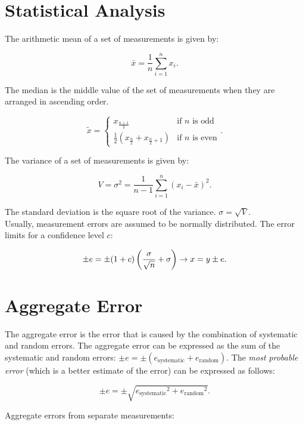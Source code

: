 \documentclass{report}
\begin{document}
\section{Statistical Analysis}

The arithmetic mean of a set of measurements is given by:

\[
	\bar{x} = \frac{1}{n} \sum_{i=1}^{n} x_i
	.\]

The median is the middle value of the set of measurements when they are arranged in ascending order.

\[
	\tilde{x} = \begin{cases}
		x_{\frac{n+1}{2}}                                 & \text{if $n$ is odd}  \\
		\frac{1}{2} (x_{\frac{n}{2}} + x_{\frac{n}{2}+1}) & \text{if $n$ is even}
	\end{cases}
	.\]

The variance of a set of measurements is given by:

\[
	V = \sigma^2 = \frac{1}{n-1} \sum_{i=1}^{n} (x_i - \bar{x})^2
	.\]

The standard deviation is the square root of the variance. $\sigma = \sqrt{V}$.\\

Usually, measurement errors are assumed to be normally distributed. The error limits for a confidence level $c$:

\[
	\pm e = \pm (1+c) \left( \frac{\sigma }{\sqrt{n}} + \sigma \right) \rightarrow x = y \pm e
	.\]

\section{Aggregate Error}

The aggregate error is the error that is caused by the combination of systematic and random errors. The aggregate error can be expressed as the sum of the systematic and random errors: $\pm e = \pm(e_\text{systematic} + e_\text{random})$.
The \emph{most probable error} (which is a better estimate of the error) can be expressed as follows:

\[
	\pm e = \pm \sqrt{{e_\text{systematic}}^2 + {e_\text{random}}^2}
	.\]

Aggregate errors from separate measurements:
\end{document}
